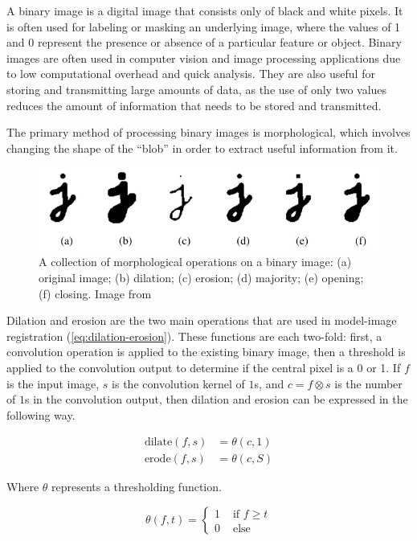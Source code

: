 A binary image is a digital image that consists only of black and white pixels.
It is often used for labeling or masking an underlying image, where the values of 1 and 0 represent the presence or absence of a particular feature or object.
Binary images are often used in computer vision and image processing applications due to low computational overhead and quick analysis.
They are also useful for storing and transmitting large amounts of data, as the use of only two values reduces the amount of information that needs to be stored and transmitted.

The primary method of processing binary images is morphological, which involves changing the shape of the ``blob'' in order to extract useful information from it.

\begin{figure}[h!]
    \includegraphics[width = \linewidth]{figs/background/png/binary-image-processing.jpg}
    \caption[A collection of morphological operations on a binary image]{A collection of morphological operations on a binary image: (a) original image; (b) dilation; (c) erosion; (d) majority; (e) opening; (f) closing. Image from \cite{szeliskiComputerVisionAlgorithms2022}}
    \label{fig:binary-image-processing}
\end{figure}

Dilation and erosion are the two main operations that are used in model-image registration (\ref{eq:dilation-erosion}).
These functions are each two-fold: first, a convolution operation is applied to the existing binary image, then a threshold is applied to the convolution output to determine if the central pixel is a 0 or 1.
If $f$ is the input image, $s$ is the convolution kernel of $1$s, and $c=f\otimes s$ is the number of $1$s in the convolution output, then dilation and erosion can be expressed in the following way.

\begin{equation}
    \begin{aligned}
        \text{dilate}(f,s) &= \theta(c,1) \\
        \text{erode}(f,s) &= \theta(c,S) 
    \end{aligned}
    \label{eq:dilation-erosion}
\end{equation}

Where $\theta$ represents a thresholding function.

\begin{equation}
    \theta (f,t) = \begin{cases}
        1 &\text{ if } f\ge t \\
        0 &\text{ else}
    \end{cases}
\end{equation}

